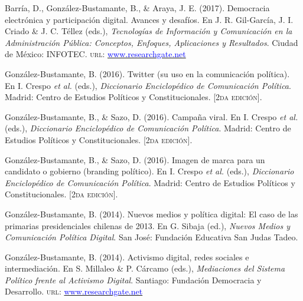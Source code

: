 \begin{publications}
\begin{benumerate}{13}
\item{\small Barr\'ia, D., Gonz\'alez-Bustamante, B., \& Araya, J. E. (2017). Democracia electrónica y participación digital. Avances y desafíos. En J. R. Gil-Garc\'ia, J. I. Criado \&  J. C. T\'ellez (eds.), {\itshape Tecnolog\'ias de Informaci\'on y Comunicaci\'on en la Administraci\'on P\'ublica: Conceptos, Enfoques, Aplicaciones y Resultados}. Ciudad de México: INFOTEC. {\scshape url}: \href{https://www.researchgate.net/publication/321980289_Democracia_electronica_y_participacion_digital_Avances_y_desafios}{\textcolor{blue}{www.researchgate.net}}} \vspace{1mm}

\item{\small Gonz\'alez-Bustamante, B. (2016). Twitter (su uso en la comunicación política). En I. Crespo {\itshape et al.} (eds.), {\itshape Diccionario Enciclop\'edico de Comunicaci\'on Pol\'itica}. Madrid: Centro de Estudios Políticos y Constitucionales. {\footnotesize \scshape [2da edición]}.} \vspace{1mm}

\item{\small Gonz\'alez-Bustamante, B., \& Sazo, D. (2016). Campaña viral. En I. Crespo {\itshape et al.} (eds.), {\itshape Diccionario Enciclop\'edico de Comunicaci\'on Pol\'itica}. Madrid: Centro de Estudios Políticos y Constitucionales. {\footnotesize \scshape [2da edición]}.} \vspace{1mm}

\item{\small Gonz\'alez-Bustamante, B., \& Sazo, D. (2016). Imagen de marca para un candidato o gobierno (branding político). En I. Crespo {\itshape et al.} (eds.), {\itshape Diccionario Enciclop\'edico de Comunicaci\'on Pol\'itica}. Madrid: Centro de Estudios Políticos y Constitucionales. {\footnotesize \scshape [2da edición]}.} \vspace{1mm}

\item{\small Gonz\'alez-Bustamante, B. (2014). Nuevos medios y política digital: El caso de las primarias presidenciales chilenas de 2013. En G. Sibaja (ed.), {\itshape Nuevos Medios y Comunicaci\'on Pol\'itica Digital}. San José: Fundación Educativa San Judas Tadeo.} \vspace{1mm}

\item{\small Gonz\'alez-Bustamante, B. (2014). Activismo digital, redes sociales e intermediación. En S. Millaleo \& P. C\'arcamo (eds.), {\itshape Mediaciones del Sistema Pol\'itico frente al Activismo Digital}. Santiago: Fundación Democracia y Desarrollo. {\scshape url}: \href{https://www.researchgate.net/publication/321992867_Activismo_digital_redes_sociales_e_intermediacion}{\textcolor{blue}{www.researchgate.net}}} \vspace{1mm}


\end{benumerate}
\end{publications}
